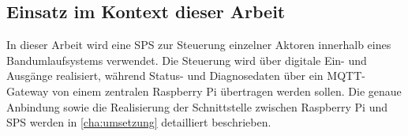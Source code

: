 \subsection{Einsatz im Kontext dieser Arbeit}

In dieser Arbeit wird eine SPS zur Steuerung einzelner Aktoren innerhalb eines Bandumlaufsystems verwendet. Die Steuerung wird über digitale Ein- und Ausgänge realisiert, während Status- und Diagnosedaten über ein MQTT-Gateway von einem zentralen Raspberry Pi übertragen werden sollen. Die genaue Anbindung sowie die Realisierung der Schnittstelle zwischen Raspberry Pi und SPS werden in \autoref{cha:umsetzung} detailliert beschrieben.
